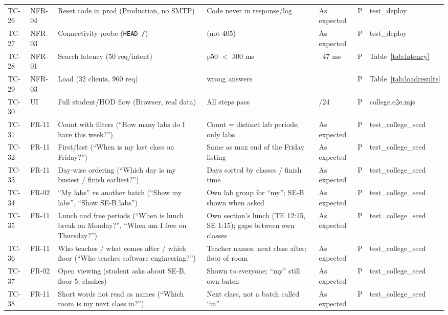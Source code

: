\begin{longtable}{@{}p{1.15cm}p{1.2cm}>{\raggedright\arraybackslash}p{4.4cm}>{\raggedright\arraybackslash}p{3.6cm}>{\raggedright\arraybackslash}p{2.1cm}p{0.6cm}>{\raggedright\arraybackslash}p{2.3cm}@{}}
TC-26 & NFR-04 & Reset code in prod (Production, no SMTP) & Code never in response/log & As expected & P & test\_\allowbreak{}deploy\\
TC-27 & NFR-03 & Connectivity probe (\texttt{HEAD /}) & 200 (not 405) & As expected & P & test\_\allowbreak{}deploy\\
TC-28 & NFR-01 & Search latency (50 req/intent) & p50 $<$ 300 ms & 37--47 ms & P & Table~\ref{tab:latency}\\
TC-29 & NFR-03 & Load (32 clients, 960 req) & 0 wrong answers & 0 & P & Table~\ref{tab:loadresults}\\
TC-30 & UI & Full student/HOD flow (Browser, real data) & All steps pass & 24/24 & P & college.e2e.mjs\\
TC-31 & FR-11 & Count with filters (``How many labs do I have this week?'') & Count = distinct lab periods; only labs & As expected & P & test\_\allowbreak{}college\_\allowbreak{}seed\\
TC-32 & FR-11 & First/last (``When is my last class on Friday?'') & Same as max end of the Friday listing & As expected & P & test\_\allowbreak{}college\_\allowbreak{}seed\\
TC-33 & FR-11 & Day-wise ordering (``Which day is my busiest / finish earliest?'') & Days sorted by classes / finish time & As expected & P & test\_\allowbreak{}college\_\allowbreak{}seed\\
TC-34 & FR-02 & ``My labs'' vs another batch (``Show my labs'', ``Show SE-B labs'') & Own lab group for ``my''; SE-B shown when asked & As expected & P & test\_\allowbreak{}college\_\allowbreak{}seed\\
TC-35 & FR-11 & Lunch and free periods (``When is lunch break on Monday?'', ``When am I free on Thursday?'') & Own section's lunch (TE 12:15, SE 1:15); gaps between own classes & As expected & P & test\_\allowbreak{}college\_\allowbreak{}seed\\
TC-36 & FR-11 & Who teaches / what comes after / which floor (``Who teaches software engineering?'') & Teacher names; next class after; floor of room & As expected & P & test\_\allowbreak{}college\_\allowbreak{}seed\\
TC-37 & FR-02 & Open viewing (student asks about SE-B, floor 5, clashes) & Shown to everyone; ``my'' still own batch & As expected & P & test\_\allowbreak{}college\_\allowbreak{}seed\\
TC-38 & FR-11 & Short words not read as names (``Which room is my next class in?'') & Next class, not a batch called ``in'' & As expected & P & test\_\allowbreak{}college\_\allowbreak{}seed\\
\bottomrule
\end{longtable}
\endgroup
